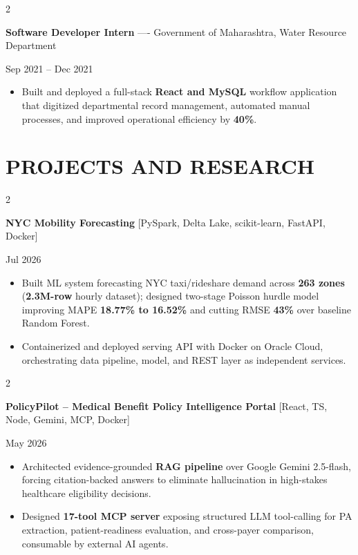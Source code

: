 \documentclass[10pt, letterpaper]{article}
\newenvironment{highlights}{
    \begin{itemize}[
        topsep=0.10 cm,
        parsep=0.06 cm,
        partopsep=0pt,
        itemsep=0.06 cm,
        leftmargin=12pt
    ]
}{
    \end{itemize}
}
\newenvironment{twocolentry}[2][]{
    \onecolentry
    \def\secondColumn{#2}
    \setcolumnwidth{\fill, 4.5 cm}
    \begin{paracol}{2}
}{
    \switchcolumn \raggedleft \secondColumn
    \end{paracol}
    \endonecolentry
}
\begin{document}
\vspace{0.15 cm}

\begin{twocolentry}{Sep 2021 -- Dec 2021}
\textbf{Software Developer Intern} ---- Government of Maharashtra, Water Resource Department
\end{twocolentry}
\begin{highlights}
  \item Built and deployed a full-stack \textbf{React and MySQL} workflow application that digitized departmental record management, automated manual processes, and improved operational efficiency by \textbf{40\%}.
\end{highlights}

\section{PROJECTS AND RESEARCH}
\begin{twocolentry}{Jul 2026}
\textbf{NYC Mobility Forecasting} [PySpark, Delta Lake, scikit-learn, FastAPI, Docker]
\end{twocolentry}
\begin{highlights}
  \item Built ML system forecasting NYC taxi/rideshare demand across \textbf{263 zones} (\textbf{2.3M-row} hourly dataset); designed two-stage Poisson hurdle model improving MAPE \textbf{18.77\% to 16.52\%} and cutting RMSE \textbf{43\%} over baseline Random Forest.
  \item Containerized and deployed serving API with Docker on Oracle Cloud, orchestrating data pipeline, model, and REST layer as independent services.
\end{highlights}

\vspace{0.12 cm}

\begin{twocolentry}{May 2026}
\textbf{PolicyPilot -- Medical Benefit Policy Intelligence Portal} [React, TS, Node, Gemini, MCP, Docker]
\end{twocolentry}
\begin{highlights}
  \item Architected evidence-grounded \textbf{RAG pipeline} over Google Gemini 2.5-flash, forcing citation-backed answers to eliminate hallucination in high-stakes healthcare eligibility decisions.
  \item Designed \textbf{17-tool MCP server} exposing structured LLM tool-calling for PA extraction, patient-readiness evaluation, and cross-payer comparison, consumable by external AI agents.
\end{highlights}
\end{document}
